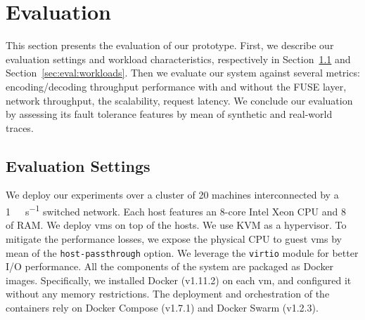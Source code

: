 \section{Evaluation}
\label{sec:evaluation}

This section presents the evaluation of our \SYS prototype. 
First, we describe our evaluation settings and workload characteristics, respectively in Section~\ref{sec:eval:settings} and Section~\ref{sec:eval:workloads}.
Then we evaluate our system against several metrics: encoding/decoding throughput performance with and without the FUSE layer, network throughput, the scalability, request latency.
We conclude our evaluation by assessing its fault tolerance features by mean of synthetic and real-world traces.

\subsection{Evaluation Settings}
\label{sec:eval:settings}

We deploy our experiments over a cluster of \num{20} machines interconnected by a \SI{1}{\giga\bit\per\second} switched network.
Each host features an 8-core Intel Xeon CPU and \SI{8}{\giga\byte} of RAM.
We deploy \acp{vm} on top of the hosts.
We use KVM as a hypervisor.
To mitigate the performance losses, we expose the physical CPU to guest \acp{vm} by mean of the \texttt{host-passthrough} option.
We leverage the \texttt{virtio} module for better I/O performance.
All the components of the system are packaged as Docker images.
Specifically, we installed Docker (v1.11.2) on each \ac{vm}, and configured it without any memory restrictions.
The deployment and orchestration of the containers rely on Docker Compose (v1.7.1) and Docker Swarm (v1.2.3).


